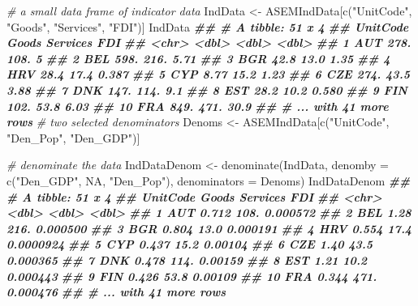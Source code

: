 \documentclass[
]{book}
\newenvironment{Shaded}{\begin{snugshade}}{\end{snugshade}}
\newcommand{\AttributeTok}[1]{\textcolor[rgb]{0.77,0.63,0.00}{#1}}
\newcommand{\CommentTok}[1]{\textcolor[rgb]{0.56,0.35,0.01}{\textit{#1}}}
\newcommand{\ConstantTok}[1]{\textcolor[rgb]{0.00,0.00,0.00}{#1}}
\newcommand{\DocumentationTok}[1]{\textcolor[rgb]{0.56,0.35,0.01}{\textbf{\textit{#1}}}}
\newcommand{\FunctionTok}[1]{\textcolor[rgb]{0.00,0.00,0.00}{#1}}
\newcommand{\NormalTok}[1]{#1}
\newcommand{\OtherTok}[1]{\textcolor[rgb]{0.56,0.35,0.01}{#1}}
\newcommand{\StringTok}[1]{\textcolor[rgb]{0.31,0.60,0.02}{#1}}
\begin{document}
\begin{Shaded}
\begin{Highlighting}[]
\CommentTok{\# a small data frame of indicator data}
\NormalTok{IndData }\OtherTok{\textless{}{-}}\NormalTok{ ASEMIndData[}\FunctionTok{c}\NormalTok{(}\StringTok{"UnitCode"}\NormalTok{, }\StringTok{"Goods"}\NormalTok{, }\StringTok{"Services"}\NormalTok{, }\StringTok{"FDI"}\NormalTok{)]}
\NormalTok{IndData}
\DocumentationTok{\#\# \# A tibble: 51 x 4}
\DocumentationTok{\#\#    UnitCode  Goods Services    FDI}
\DocumentationTok{\#\#    \textless{}chr\textgreater{}     \textless{}dbl\textgreater{}    \textless{}dbl\textgreater{}  \textless{}dbl\textgreater{}}
\DocumentationTok{\#\#  1 AUT      278.      108.   5    }
\DocumentationTok{\#\#  2 BEL      598.      216.   5.71 }
\DocumentationTok{\#\#  3 BGR       42.8      13.0  1.35 }
\DocumentationTok{\#\#  4 HRV       28.4      17.4  0.387}
\DocumentationTok{\#\#  5 CYP        8.77     15.2  1.23 }
\DocumentationTok{\#\#  6 CZE      274.       43.5  3.88 }
\DocumentationTok{\#\#  7 DNK      147.      114.   9.1  }
\DocumentationTok{\#\#  8 EST       28.2      10.2  0.580}
\DocumentationTok{\#\#  9 FIN      102.       53.8  6.03 }
\DocumentationTok{\#\# 10 FRA      849.      471.  30.9  }
\DocumentationTok{\#\# \# ... with 41 more rows}
\CommentTok{\# two selected denominators}
\NormalTok{Denoms }\OtherTok{\textless{}{-}}\NormalTok{ ASEMIndData[}\FunctionTok{c}\NormalTok{(}\StringTok{"UnitCode"}\NormalTok{, }\StringTok{"Den\_Pop"}\NormalTok{, }\StringTok{"Den\_GDP"}\NormalTok{)]}

\CommentTok{\# denominate the data}
\NormalTok{IndDataDenom }\OtherTok{\textless{}{-}} \FunctionTok{denominate}\NormalTok{(IndData, }\AttributeTok{denomby =} \FunctionTok{c}\NormalTok{(}\StringTok{"Den\_GDP"}\NormalTok{, }\ConstantTok{NA}\NormalTok{, }\StringTok{"Den\_Pop"}\NormalTok{), }\AttributeTok{denominators =}\NormalTok{ Denoms)}
\NormalTok{IndDataDenom}
\DocumentationTok{\#\# \# A tibble: 51 x 4}
\DocumentationTok{\#\#    UnitCode Goods Services       FDI}
\DocumentationTok{\#\#    \textless{}chr\textgreater{}    \textless{}dbl\textgreater{}    \textless{}dbl\textgreater{}     \textless{}dbl\textgreater{}}
\DocumentationTok{\#\#  1 AUT      0.712    108.  0.000572 }
\DocumentationTok{\#\#  2 BEL      1.28     216.  0.000500 }
\DocumentationTok{\#\#  3 BGR      0.804     13.0 0.000191 }
\DocumentationTok{\#\#  4 HRV      0.554     17.4 0.0000924}
\DocumentationTok{\#\#  5 CYP      0.437     15.2 0.00104  }
\DocumentationTok{\#\#  6 CZE      1.40      43.5 0.000365 }
\DocumentationTok{\#\#  7 DNK      0.478    114.  0.00159  }
\DocumentationTok{\#\#  8 EST      1.21      10.2 0.000443 }
\DocumentationTok{\#\#  9 FIN      0.426     53.8 0.00109  }
\DocumentationTok{\#\# 10 FRA      0.344    471.  0.000476 }
\DocumentationTok{\#\# \# ... with 41 more rows}
\end{Highlighting}
\end{Shaded}
\end{document}
